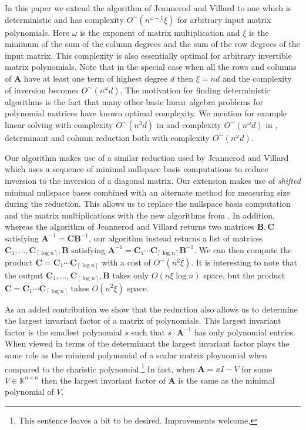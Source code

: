 \documentclass[a4paper,11pt]{article}
\begin{document}
In this paper we extend the algorithm of Jeannerod and Villard to one which is deterministic  and has complexity $O^{\sim}\left(n^{\omega-1}\xi\right)$ for arbitrary input matrix polynomials. Here $\omega$ is the exponent of matrix multiplication and $\xi$ is the minimum of the sum of the column degrees and the sum of the row degrees of the input matrix. This complexity is also essentially optimal for arbitrary
invertible matrix polynomials. Note that in the special case when all the rows and columns of 
$\mathbf{A}$  have at least one term of highest degree $d$ then $\xi = n d$ and the complexity of inversion becomes $O^{\sim}\left(n^{\omega} d \right)$. The motivation for finding deterministic
algorithms is the fact that many other basic linear algebra problems for polynomial matrices have known optimal complexity. We mention for example linear solving with complexity $O^{\sim}\left(n^{3} d \right)$ in \cite{dixon82,moenck} and complexity $O^{\sim}\left(n^{\omega} d \right)$ in \cite{storjohan2002}, determinant  \cite{storjohan2002} and column reduction \cite{Giorgi2003}
both with complexity $O^{\sim}\left(n^{\omega} d \right)$.

Our algorithm makes use of a similar reduction used by Jeannerod and Villard \cite{jeannerod-villard:05} which uses a sequence of minimal nullspace basis computations to reduce inversion to the inversion of a diagonal matrix.  Our extension makes use of {\em shifted} minimal nullspace bases combined with an alternate method for measuring size during the reduction. This allows us to replace the nullspace basis computation and the matrix multiplications with the new algorithms from \cite{zhou-labahn-storjohann:12}. In addition, whereas the algorithm of Jeannerod and Villard returns two matrices $\mathbf{B},\mathbf{C}$ satisfying $\mathbf{A}^{-1} = \mathbf{C}\mathbf{B}^{-1}$, our algorithm instead returns a list of matrices $\mathbf{C}_{1},\dots,\mathbf{C}_{\left\lceil \log n\right\rceil },\mathbf{B}$
satisfying $\mathbf{A}^{-1} = \mathbf{C}_{1}\cdots\mathbf{C}_{\left\lceil \log n\right\rceil }\mathbf{B}^{-1}$.
We can then compute the product $\mathbf{C}=\mathbf{C}_{1}\cdots\mathbf{C}_{\left\lceil \log n\right\rceil }$
with a cost of $O^{\sim}\left(n^{2}\xi\right)$. It is interesting
to note that the output $\mathbf{C}_{1},\dots,\mathbf{C}_{\left\lceil \log n\right\rceil },\mathbf{B}$
takes only $O(n\xi\log n)$ space, but the product $\mathbf{C}=\mathbf{C}_{1}\cdots\mathbf{C}_{\left\lceil \log n\right\rceil }$
takes $O(n^{2}\xi)$ space. 

As an added contribution we show that the reduction also allows us to determine the largest invariant factor of a matrix of polynomials. This largest invariant factor is the smallest polynomial $s$ such that $s \cdot \mathbf{A}^{-1}$ has only polynomial entries. When viewed in terms of the determinant the largest invariant factor plays the same role as the minimal polynomial of a scalar matrix ploynomial when compared to the charistic polynomial.\footnote{ This sentence leaves a bit to be desired. Improvements welcome. }
In fact, when ${\mathbf{A}} = x I - V$ for some $V \in \mathbb{K}^{n\times n}$ then the largest invariant factor of ${\mathbf{A}}$ is the same as the minimal polynomial of $V$.
\end{document}
